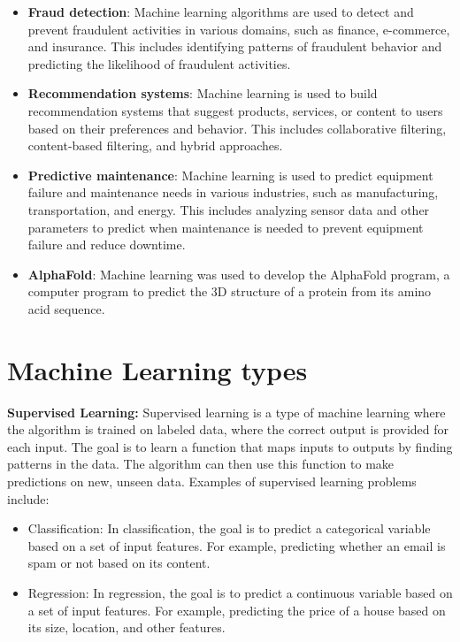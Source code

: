 \documentclass{article}
\begin{document}
\begin{itemize}
    \item \textbf{Fraud detection}: Machine learning algorithms are used to detect and prevent fraudulent activities in various domains, such as finance, e-commerce, and insurance. This includes identifying patterns of fraudulent behavior and predicting the likelihood of fraudulent activities.
    
    \item \textbf{Recommendation systems}: Machine learning is used to build recommendation systems that suggest products, services, or content to users based on their preferences and behavior. This includes collaborative filtering, content-based filtering, and hybrid approaches.
    
    \item \textbf{Predictive maintenance}: Machine learning is used to predict equipment failure and maintenance needs in various industries, such as manufacturing, transportation, and energy. This includes analyzing sensor data and other parameters to predict when maintenance is needed to prevent equipment failure and reduce downtime.
    
    \item \textbf{AlphaFold}: Machine learning was used to develop the AlphaFold program, a computer program to predict the 3D structure of a protein from its amino acid sequence.
\end{itemize}

\section{Machine Learning types}
\textbf{Supervised Learning:}
Supervised learning is a type of machine learning where the algorithm is trained on labeled data, where the correct output is provided for each input. The goal is to learn a function that maps inputs to outputs by finding patterns in the data. The algorithm can then use this function to make predictions on new, unseen data. Examples of supervised learning problems include:

\begin{itemize}
\item Classification: In classification, the goal is to predict a categorical variable based on a set of input features. For example, predicting whether an email is spam or not based on its content.
\item Regression: In regression, the goal is to predict a continuous variable based on a set of input features. For example, predicting the price of a house based on its size, location, and other features.
\end{itemize}
\end{document}
